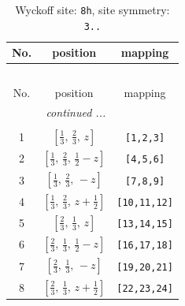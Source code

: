 \documentclass[fleqn,8pt]{jsarticle}
\begin{document}
\begin{longtable}{ccc}
\caption{Wyckoff site: {\tt 8h}, site symmetry: {\tt 3..}}
 \\
 \hline \hline
No. & position & mapping \\ \hline \endfirsthead

\multicolumn{2}{l}{\tablename\ \thetable{}} \\
 \hline \hline
No. & position & mapping \\ \hline \endhead

 \hline \hline
\multicolumn{2}{r}{\footnotesize\it continued ...} \\ \endfoot

 \hline \hline
\multicolumn{2}{r}{} \\ \endlastfoot

1 & $\left[ \frac{1}{3},\, \frac{2}{3},\, z \right]$ & {\tt [1,2,3]} \\ \hline
2 & $\left[ \frac{1}{3},\, \frac{2}{3},\, \frac{1}{2} - z \right]$ & {\tt [4,5,6]} \\ \hline
3 & $\left[ \frac{1}{3},\, \frac{2}{3},\, - z \right]$ & {\tt [7,8,9]} \\ \hline
4 & $\left[ \frac{1}{3},\, \frac{2}{3},\, z + \frac{1}{2} \right]$ & {\tt [10,11,12]} \\ \hline
5 & $\left[ \frac{2}{3},\, \frac{1}{3},\, z \right]$ & {\tt [13,14,15]} \\ \hline
6 & $\left[ \frac{2}{3},\, \frac{1}{3},\, \frac{1}{2} - z \right]$ & {\tt [16,17,18]} \\ \hline
7 & $\left[ \frac{2}{3},\, \frac{1}{3},\, - z \right]$ & {\tt [19,20,21]} \\ \hline
8 & $\left[ \frac{2}{3},\, \frac{1}{3},\, z + \frac{1}{2} \right]$ & {\tt [22,23,24]} \\
\end{longtable}
\renewcommand{\arraystretch}{1.2}
\end{document}
